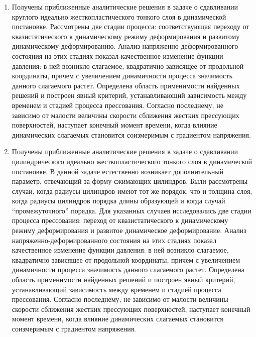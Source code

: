 \begin{enumerate}
  \item Получены приближенные аналитические решения в задаче о сдавливании круглого идеально жесткопластического тонкого слоя в динамической постановке. Рассмотрены две стадии процесса: соответствующая переходу от квазистатического к динамическому режиму деформирования и развитому динамическому деформированию. Анализ напряженно-деформированного состояния на этих стадиях показал качественное изменение функции давления: в ней возникло слагаемое, квадратично зависящее от продольной координаты, причем с увеличением динамичности процесса значимость данного слагаемого растет. Определена область применимости найденных решений и построен явный критерий, устанавливающий зависимость между временем и стадией процесса прессования.  Согласно последнему, не зависимо от малости величины скорости сближения жестких прессующих поверхностей, наступает конечный момент времени, когда влияние динамических слагаемых становится соизмеримым с градиентом напряжения.
  \item Получены приближенные аналитические решения в задаче о сдавливании цилиндрического идеально жесткопластического тонкого слоя в динамической постановке. В данной задаче естественно возникает дополнительный параметр, отвечающий за форму сжимающих цилиндров. Были рассмотрены случаи, когда радиусы цилиндров имеют тот же порядок, что и толщина слоя, когда радиусы цилиндров порядка длины образующей и когда случай ``промежуточного'' порядка. Для указанных случаев исследовались две стадии процесса прессования: переход от квазистатического к динамическому режиму деформирования и развитое динамическое деформирование. Анализ напряженно-деформированного состояния на этих стадиях показал качественное изменение функции давления: в ней возникло слагаемое, квадратично зависящее от продольной координаты, причем с увеличением динамичности процесса значимость данного слагаемого растет. Определена область применимости найденных решений и построен явный критерий, устанавливающий зависимость между временем и стадией процесса прессования.  Согласно последнему, не зависимо от малости величины скорости сближения жестких прессующих поверхностей, наступает конечный момент времени, когда влияние динамических слагаемых становится соизмеримым с градиентом напряжения.

\end{enumerate}

